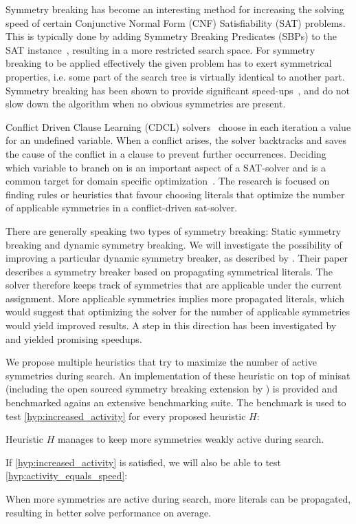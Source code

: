 Symmetry breaking has become an interesting method for increasing the solving speed of
certain Conjunctive Normal Form (CNF) Satisfiability (SAT) problems.
This is typically done by adding Symmetry Breaking Predicates (SBPs) to the SAT
instance~\cite{sakallah2009symmetry}, resulting in a more restricted search space.
For symmetry breaking to be applied effectively the given problem has to exert symmetrical
properties, i.e. some part of the search tree is virtually identical to another part.
Symmetry breaking has been shown to provide significant
speed-ups~\cite{darga2004exploiting,aloul2003solving}, and do not slow down the algorithm
when no obvious symmetries are present.

Conflict Driven Clause Learning (CDCL) solvers~\cite{marques1999grasp} choose in each iteration a value for an undefined variable.
When a conflict arises, the solver backtracks
and saves the cause of the conflict in a clause to prevent further occurrences.
Deciding which variable to branch on is an important aspect of a SAT-solver and is a common target
for domain specific optimization~\cite{een2004extensible}.
The research is focused on finding rules or heuristics that favour choosing literals
that optimize the number of applicable symmetries in a conflict-driven sat-solver.

There are generally speaking two types of symmetry breaking: Static symmetry breaking and
dynamic symmetry breaking.
We will investigate the possibility of improving a particular dynamic symmetry breaker, as described
by \cite{devriendt2012symmetry}.
Their paper describes a symmetry breaker based on propagating symmetrical literals.
The solver therefore keeps track of symmetries that are applicable under the current assignment.
More applicable symmetries implies more propagated literals, which would suggest that
optimizing the solver for the number of applicable symmetries would yield improved results.
A step in this direction has been investigated by \cite{devriendt2012symmetry} and yielded
promising speedups.

We propose multiple heuristics that try to maximize the number of active symmetries during
search.
An implementation of these heuristic on top of minisat (including the open sourced symmetry breaking
extension by \cite{devriendt2012symmetry}) is provided and benchmarked agains an extensive
benchmarking suite.
The benchmark is used to test \cref{hyp:increased_activity} for every proposed heuristic
$H$: \\

\begin{hypothesis}
\label{hyp:increased_activity}
	Heuristic $H$ manages to keep more symmetries weakly active during search.
\end{hypothesis}

If \cref{hyp:increased_activity} is satisfied, we will also be able to test
\cref{hyp:activity_equals_speed}: \\

\begin{hypothesis}
\label{hyp:activity_equals_speed}
	When more symmetries are active during search, more literals can be propagated, resulting in
	better solve performance on average.
\end{hypothesis}
